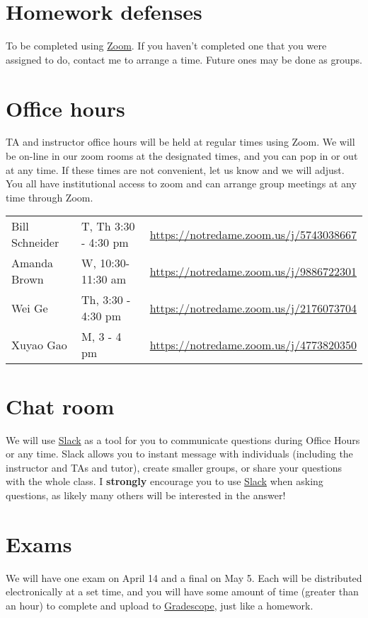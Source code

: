 \documentclass[11pt]{article}
\begin{document}
\section{Homework defenses}
\label{sec:org94bf85a}
To be completed using \href{https://notredame.zoom.us/meeting}{Zoom}.  If you haven't completed one that you were assigned to do, contact me to arrange a time.  Future ones may be done as groups.

\section{Office hours}
\label{sec:org6d70159}
TA and instructor office hours will be held at regular times using Zoom.  We will be on-line in our zoom rooms at the designated times, and you can pop in or out at any time. If these times are not convenient, let us know and we will adjust. You all have institutional access to zoom and can arrange group meetings at any time through Zoom.

\begin{center}
\begin{tabular}{lll}
Bill Schneider & T, Th 3:30 - 4:30 pm & \url{https://notredame.zoom.us/j/5743038667}\\
Amanda Brown & W, 10:30- 11:30 am & \url{https://notredame.zoom.us/j/9886722301}\\
Wei Ge & Th, 3:30 - 4:30 pm & \url{https://notredame.zoom.us/j/2176073704}\\
Xuyao Gao & M, 3 - 4 pm & \url{https://notredame.zoom.us/j/4773820350}\\
\end{tabular}
\end{center}

\section{Chat room}
\label{sec:org72e852f}
We will use \href{https://che30324-nd.slack.com}{Slack} as a tool for you to communicate questions during Office Hours or any time. Slack allows you to instant message with individuals (including the instructor and TAs and tutor), create smaller groups, or share your questions with the whole class. I \textbf{strongly} encourage you to use  \href{https://che30324-nd.slack.com}{Slack} when asking questions, as likely many others will be interested in the answer!


\section{Exams}
\label{sec:org8b09d08}
We will have one exam on April 14 and a final on May 5.  Each will be distributed electronically at a set time, and you will have some amount of time (greater than an hour) to complete and upload to \href{https://www.gradescope.com/}{Gradescope}, just like a homework.  
\end{document}
